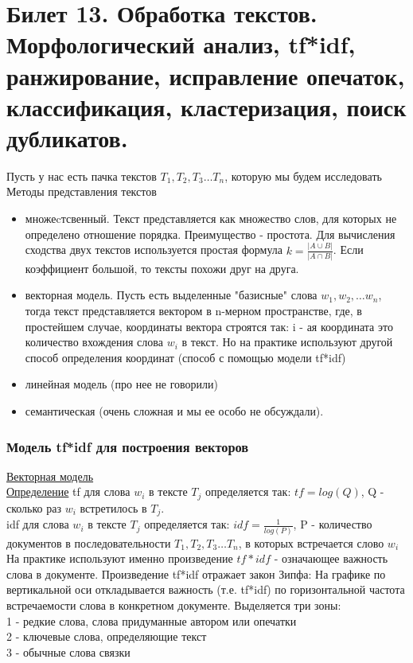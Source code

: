 \newpage
\section {Билет 13. Обработка текстов. Морфологический анализ, tf*idf, ранжирование, исправление опечаток, классификация, кластеризация, поиск дубликатов.}

Пусть у нас есть пачка текстов $T_1, T_2, T_3 \dots T_n$, которую мы будем исследовать \\
Методы представления текстов
\begin{itemize}
\item множеcтсвенный. Текст представляется как множество слов, для которых не определено отношение порядка. Преимущество - простота. Для вычисления сходства двух текстов используется простая формула $k = \frac {|A \cup B|}{|A \cap B|}$. Если коэффициент большой, то тексты похожи друг на друга.
\item векторная модель. Пусть есть выделенные  "базисные" слова $w_1, w_2, \dots w_n$, тогда текст представляется вектором в n-мерном пространстве, где, в простейшем случае, координаты вектора строятся так: i - ая координата это количество вхождения слова $w_i$ в текст. Но на практике используют другой способ определения координат (способ с помощью модели tf*idf)  
\item линейная модель (про нее не говорили)
\item семантическая (очень сложная и мы ее особо не обсуждали).
\end{itemize}

\subsubsection {Модель tf*idf для построения векторов}
\href{https://ru.wikipedia.org/wiki/Векторная_модель}{Векторная модель} \\
\underline {Определение}
tf для слова $w_i$ в тексте $T_j$ определяется так: 
 $tf = log (Q)$, Q - сколько раз $w_i$ встретилось в $T_j$.  \\
idf для слова $w_i$ в тексте $T_j$ определяется так: 
$idf = \frac{1}{log(P)}$, P - количество документов в последовательности $T_1, T_2, T_3 \dots T_n$, в которых встречается слово $w_i$ \\
На практике используют именно произведение $tf*idf$ - означающее важность слова в документе. Произведение tf*idf отражает закон Зипфа:
На графике по вертикальной оси откладывается важность (т.е. tf*idf) по горизонтальной частота встречаемости слова в конкретном документе.
Выделяется три зоны: \\
1 - редкие слова, слова придуманные автором или опечатки \\
2 - ключевые слова, определяющие текст \\
3 - обычные слова связки \\

